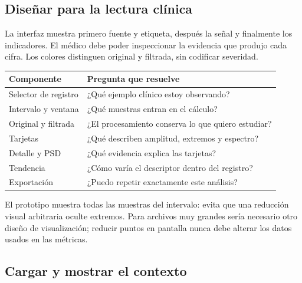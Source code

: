 \documentclass[
  spanish,
  10.5pt,
  a4paper,
  DIV=11,
  numbers=noendperiod]{scrartcl}
\newcounter{none} %
\begin{document}
\subsection{Diseñar para la lectura
clínica}\label{diseuxf1ar-para-la-lectura-cluxednica}

La interfaz muestra primero fuente y etiqueta, después la señal y
finalmente los indicadores. El médico debe poder inspeccionar la
evidencia que produjo cada cifra. Los colores distinguen original y
filtrada, sin codificar severidad.


{\def\LTcaptype{none} %
\begin{longtable}[]{@{}
  >{\raggedright\arraybackslash}p{}
  >{\raggedright\arraybackslash}p{}@{}}
\toprule\noalign{}
\begin{minipage}[b]{\linewidth}\raggedright
Componente
\end{minipage} & \begin{minipage}[b]{\linewidth}\raggedright
Pregunta que resuelve
\end{minipage} \\
\midrule\noalign{}
\endhead
\bottomrule\noalign{}
\endlastfoot
Selector de registro & ¿Qué ejemplo clínico estoy observando? \\
Intervalo y ventana & ¿Qué muestras entran en el cálculo? \\
Original y filtrada & ¿El procesamiento conserva lo que quiero
estudiar? \\
Tarjetas & ¿Qué describen amplitud, extremos y espectro? \\
Detalle y PSD & ¿Qué evidencia explica las tarjetas? \\
Tendencia & ¿Cómo varía el descriptor dentro del registro? \\
Exportación & ¿Puedo repetir exactamente este análisis? \\
\end{longtable}
}

El prototipo muestra todas las muestras del intervalo: evita que una
reducción visual arbitraria oculte extremos. Para archivos muy grandes
sería necesario otro diseño de visualización; reducir puntos en pantalla
nunca debe alterar los datos usados en las métricas.

\subsection{Cargar y mostrar el
contexto}\label{cargar-y-mostrar-el-contexto}
\end{document}
